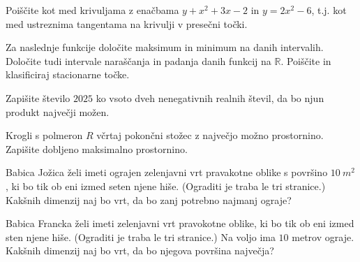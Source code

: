 \documentclass[11pt,a4paper]{exam}
\renewcommand{\{}{\lbrace}
\renewcommand{\}}{\rbrace}
\begin{document}
\begin{questions}

	\question
	Poiščite kot med krivuljama z enačbama $y + x^{2}+3x -2$ in $y = 2x^{2}-6$, t.j. kot med ustreznima tangentama na krivulji v presečni točki.

	\question Za naslednje funkcije določite maksimum in minimum na danih intervalih. Določite tudi intervale naraščanja in padanja danih funkcij na $\mathbb{R}$. Poiščite in klasificiraj stacionarne točke.

	\question Zapišite število $2025$ ko vsoto dveh nenegativnih realnih števil, da bo njun produkt največji možen.

	\question
 	Krogli s polmeron $R$ včrtaj pokončni stožec z največjo možno prostornino. Zapišite dobljeno maksimalno prostornino.

	\question
	Babica Jožica želi imeti ograjen zelenjavni vrt pravakotne oblike s površino $10 \ m^2$, ki bo tik ob eni izmed seten njene hiše. (Ograditi je traba le tri stranice.) Kakšnih dimenzij naj bo vrt, da bo zanj potrebno najmanj ograje?

	\question
	Babica Francka želi imeti zelenjavni vrt pravokotne oblike, ki bo tik ob eni izmed sten njene hiše. (Ograditi je traba le tri stranice.) Na voljo ima $10$ metrov ograje. Kakšnih dimenzij naj bo vrt, da bo njegova površina največja?

\end{questions}
\end{document}
